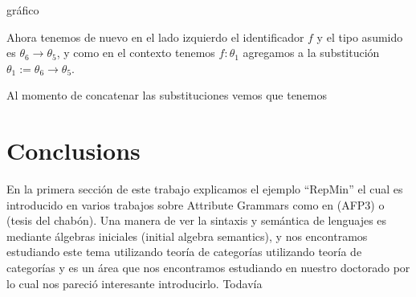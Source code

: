 \documentclass[a4paper,10pt]{article}
\begin{document}
  \begin{center}
   gráfico
  \end{center}
   
  Ahora tenemos de nuevo en el lado izquierdo el identificador $f$ y el tipo asumido es $\theta_6 \rightarrow \theta_5$,
  y como en el contexto tenemos $f:\theta_1$ agregamos a la substitución $\theta_1 := \theta_6 \rightarrow \theta_5$.
  
  Al momento de concatenar las substituciones vemos que tenemos 
  
  
  \section{Conclusions}
  
  En la primera sección de este trabajo explicamos el ejemplo ``RepMin'' el cual es introducido en varios
  trabajos sobre Attribute Grammars como en (AFP3) o (tesis del chabón). Una manera de ver la sintaxis y semántica
  de lenguajes es mediante álgebras iniciales (initial algebra semantics), y nos encontramos estudiando este tema
  utilizando teoría de categorías
  utilizando teoría de categorías y es un área que nos encontramos 
  estudiando en nuestro doctorado por lo cual nos pareció interesante introducirlo. Todavía 
  
  
  
  
   
\end{document}
